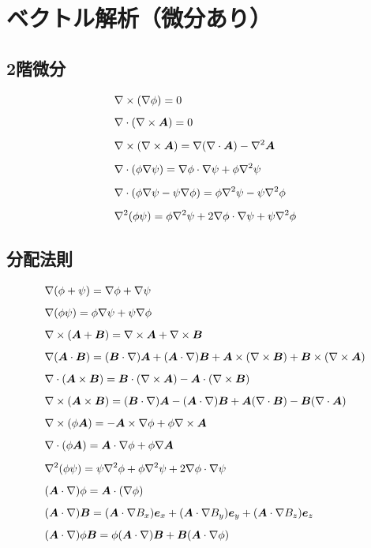 \documentclass[a4paper,uplatex,dvi=dvipdfmx,ja=standard]{bxjsarticle}
\newcommand{\bm}[1]{{\mbox{\boldmath $#1$}}}
\numberwithin{equation}{section}
\begin{document}
\section{ベクトル解析（微分あり）}
\subsection{2階微分}
\begin{align}
  & \nabla\times(\nabla\phi)=0 \label{eq-2.1} \\[0.5em]
  & \nabla\cdot(\nabla\times\bm{A})=0 \label{eq-2.2} \\[0.5em]
  & \nabla\times(\nabla\times\bm{A})=\nabla(\nabla\cdot\bm{A})-\nabla^2\bm{A} \label{eq-2.3} \\[0.5em]
  & \nabla\cdot(\phi\nabla\psi)=\nabla\phi\cdot\nabla\psi+\phi\nabla^2\psi \label{eq-2.4} \\[0.5em]
  & \nabla\cdot(\phi\nabla\psi-\psi\nabla\phi)=\phi\nabla^2\psi-\psi\nabla^2\phi \label{eq-2.5} \\[0.5em]
  & \nabla^2(\phi\psi)=\phi\nabla^2\psi+2\nabla\phi\cdot\nabla\psi+\psi\nabla^2\phi \label{eq-2.6}
\end{align}

\subsection{分配法則}
\begin{align}
  & \nabla(\phi+\psi)=\nabla\phi+\nabla\psi \label{eq-2.7} \\[0.5em]
  & \nabla(\phi\psi)=\phi\nabla\psi+\psi\nabla\phi \label{eq-2.8} \\[0.5em]
  & \nabla\times(\bm{A}+\bm{B})=\nabla\times\bm{A}+\nabla\times\bm{B} \label{eq-2.9} \\[0.5em]
  & \nabla(\bm{A}\cdot\bm{B})=(\bm{B}\cdot\nabla)\bm{A}+(\bm{A}\cdot\nabla)\bm{B}+\bm{A}\times(\nabla\times\bm{B})+\bm{B}\times(\nabla\times\bm{A}) \label{eq-2.10} \\[0.5em]
  & \nabla\cdot(\bm{A}\times\bm{B})=\bm{B}\cdot(\nabla\times\bm{A})-\bm{A}\cdot(\nabla\times\bm{B}) \label{eq-2.11} \\[0.5em]
  & \nabla\times(\bm{A}\times\bm{B})=(\bm{B}\cdot\nabla)\bm{A}-(\bm{A}\cdot\nabla)\bm{B}+\bm{A}(\nabla\cdot\bm{B})-\bm{B}(\nabla\cdot\bm{A}) \label{eq-2.12} \\[0.5em]
  & \nabla\times(\phi\bm{A})=-\bm{A}\times\nabla\phi+\phi\nabla\times\bm{A} \label{eq-2.13} \\[0.5em]
  & \nabla\cdot(\phi\bm{A})=\bm{A}\cdot\nabla\phi+\phi\nabla\bm{A} \label{eq-2.14} \\[0.5em]
  & \nabla^2(\phi\psi)=\psi\nabla^2\phi+\phi\nabla^2\psi+2\nabla\phi\cdot\nabla\psi \label{eq-2.15} \\[0.5em]
  & (\bm{A}\cdot\nabla)\phi=\bm{A}\cdot(\nabla\phi) \label{eq-2.16} \\[0.5em]
  & (\bm{A}\cdot\nabla)\bm{B}=(\bm{A}\cdot\nabla B_x)\bm{e}_x+(\bm{A}\cdot\nabla B_y)\bm{e}_y+(\bm{A}\cdot\nabla B_z)\bm{e}_z \label{eq-2.17} \\[0.5em]
  & (\bm{A}\cdot\nabla)\phi\bm{B}=\phi(\bm{A}\cdot\nabla)\bm{B}+\bm{B}(\bm{A}\cdot\nabla\phi) \label{eq-2.18}
\end{align}
\end{document}
